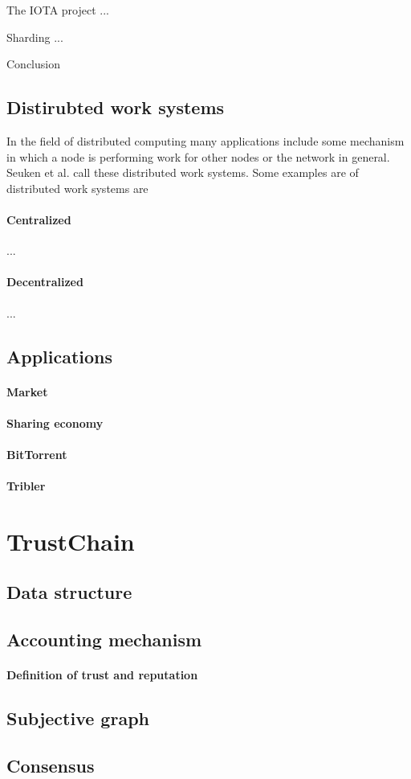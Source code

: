 The IOTA project ...

Sharding ...

Conclusion


\subsection{Distirubted work systems}
In the field of distributed computing many applications include some mechanism in which a node is
performing work for other nodes or the network in general. Seuken et al. call these distributed 
work systems. Some examples are of distributed work systems are 



\paragraph{Centralized} ...

\paragraph{Decentralized} ...

\subsection{Applications}

\paragraph{Market}
\paragraph{Sharing economy}
\paragraph{BitTorrent}
\paragraph{Tribler}

\section{TrustChain}

\subsection{Data structure}
\subsection{Accounting mechanism}
\paragraph{Definition of trust and reputation}
\subsection{Subjective graph}
\subsection{Consensus}

